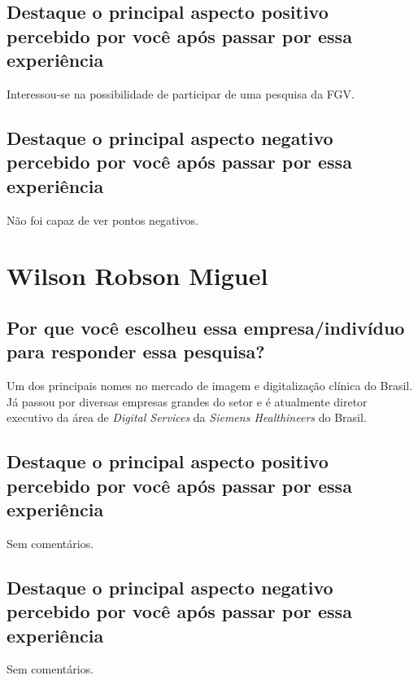 \subsection{Destaque o principal aspecto positivo percebido por você após passar por essa experiência}

Interessou-se na possibilidade de participar de uma pesquisa da FGV.

\subsection{Destaque o principal aspecto negativo percebido por você após passar por essa experiência}

Não foi capaz de ver pontos negativos.

\section{Wilson Robson Miguel}

\subsection{Por que você escolheu essa empresa/indivíduo para responder essa pesquisa?}

Um dos principais nomes no mercado de imagem e digitalização clínica do Brasil. Já passou por diversas empresas grandes do setor e é atualmente diretor executivo da área de \emph{Digital Services} da \emph{Siemens Healthineers} do Brasil.

\subsection{Destaque o principal aspecto positivo percebido por você após passar por essa experiência}

Sem comentários.

\subsection{Destaque o principal aspecto negativo percebido por você após passar por essa experiência}

Sem comentários.
